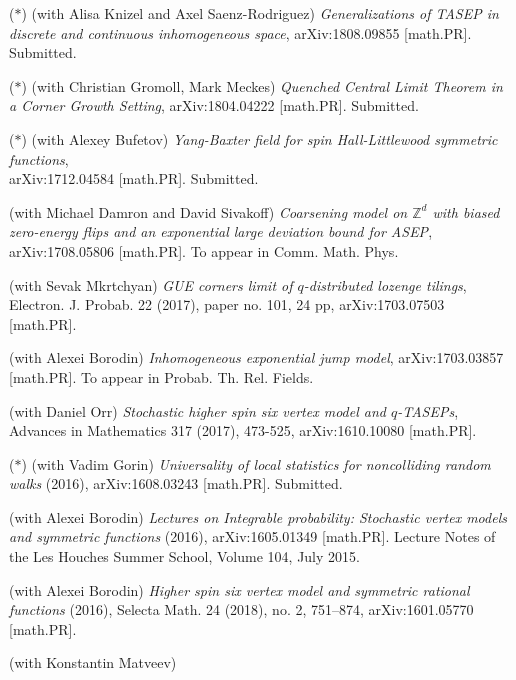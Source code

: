 \documentclass[letterpaper,11pt]{article}
\begin{document}
\begin{etaremune}
	\renewcommand{\labelenumi}{[\theenumi]}
\item ($*$)
	(with Alisa Knizel and
		Axel Saenz-Rodriguez)
		\emph{Generalizations of TASEP in discrete and continuous inhomogeneous space},
		arXiv:1808.09855 [math.PR].
		Submitted.
\item ($*$) (with Christian Gromoll, Mark Meckes)
		\emph{Quenched Central Limit Theorem in a Corner Growth Setting},
		arXiv:1804.04222 [math.PR]. Submitted.
	
	\item ($*$) (with Alexey Bufetov)
		\emph{Yang-Baxter field for spin Hall-Littlewood symmetric functions},\\
		arXiv:1712.04584 [math.PR]. Submitted.
	\item
	      (with Michael Damron and David Sivakoff) \emph{Coarsening model
		      on $\mathbb{Z}^d$ with biased zero-energy flips and an exponential large
		      deviation bound for ASEP}, arXiv:1708.05806 [math.PR].
					To appear in Comm. Math. Phys.
	\item
	      (with Sevak Mkrtchyan)
	      \emph{GUE corners limit of $q$-distributed lozenge tilings},
				Electron. J. Probab. 22 (2017), paper no. 101, 24 pp,
				arXiv:1703.07503 [math.PR].
	\item
	      (with Alexei Borodin)
	      \emph{Inhomogeneous exponential jump model},
				arXiv:1703.03857 [math.PR]. To appear in Probab. Th. Rel. Fields.
	\item
	      (with Daniel Orr)
	      \emph{Stochastic higher spin six vertex model and $q$-TASEPs},
	      Advances in Mathematics 317 (2017), 473-525, arXiv:1610.10080
	      [math.PR].
			\item ($*$)
	      (with Vadim Gorin)
	      \emph{Universality of local statistics for noncolliding random
		      walks}
	      (2016),
	      arXiv:1608.03243 [math.PR]. Submitted.
	\item
	      (with Alexei Borodin)
	      \emph{Lectures on Integrable probability: Stochastic vertex
		      models and symmetric functions}
	      (2016), arXiv:1605.01349 [math.PR]. Lecture Notes of the Les
	      Houches Summer School, Volume 104, July 2015.
	\item
	      (with Alexei Borodin)
	      \emph{Higher spin six vertex model and symmetric rational
		      functions}
	      (2016),
				Selecta Math. 24 (2018), no. 2, 751--874,
	      arXiv:1601.05770 [math.PR].
	\item
	      (with Konstantin Matveev)

\end{etaremune}
\end{document}
